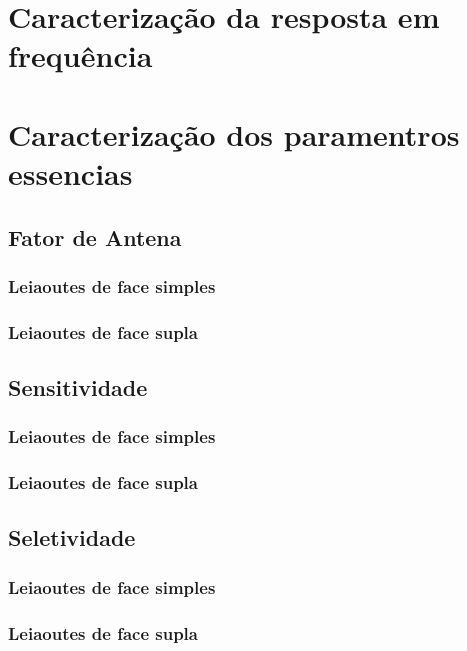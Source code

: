 \section{Caracterização da resposta em frequência}

\section{Caracterização dos paramentros essencias}


\subsection{Fator de Antena}

\subsubsection*{Leiaoutes de face simples}

\subsubsection*{Leiaoutes de face supla}


\subsection{Sensitividade}

\subsubsection*{Leiaoutes de face simples}

\subsubsection*{Leiaoutes de face supla}


\subsection{Seletividade}

\subsubsection*{Leiaoutes de face simples}

\subsubsection*{Leiaoutes de face supla}


